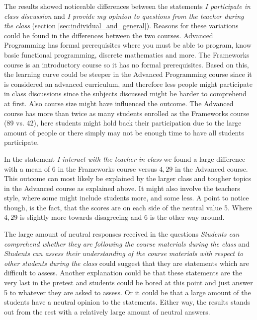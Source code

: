 The results showed noticeable differences between the statements \emph{I participate in class discussion} and \emph{I provide my opinion to questions from the teacher during the class} (section \ref{sec:individual_and_general}). Reasons for these variations could be found in the differences between the two courses. Advanced Programming has formal prerequisites where you must be able to program, know basic functional programming, discrete mathematics and more. The Frameworks course is an introductory course so it has no formal prerequisites. Based on this, the learning curve could be steeper in the Advanced Programming course since it is considered an advanced curriculum, and therefore less people might participate in class discussions since the subjects discussed might be harder to comprehend at first. Also course size might have influenced the outcome. The Advanced course has more than twice as many students enrolled as the Frameworks course (89 vs. 42), here students might hold back their participation due to the large amount of people or there simply may not be enough time to have all students participate.


In the statement \emph{I interact with the teacher in class} we found a large difference with a mean of $6$ in the Frameworks course versus $4,29$ in the Advanced course. This outcome can most likely be explained by the larger class and tougher topics in the Advanced course as explained above. It might also involve the teachers style, where some might include students more, and some less. A point to notice though, is the fact, that the scores are on each side of the neutral value 5. Where $4,29$ is slightly more towards disagreeing and $6$ is the other way around.



The large amount of neutral responses received in the questions \emph{Students can comprehend whether they are following the course materials during the class} and \emph{Students can assess their understanding of the course materials with respect to other students during the class} could suggest that they are statements which are difficult to assess. Another explanation could be that these statements are the very last in the pretest and students could be bored at this point and just answer 5 to whatever they are asked to assess. Or it could be that a large amount of the students have a neutral opinion to the statements. Either way, the results stands out from the rest with a relatively large amount of neutral answers.




